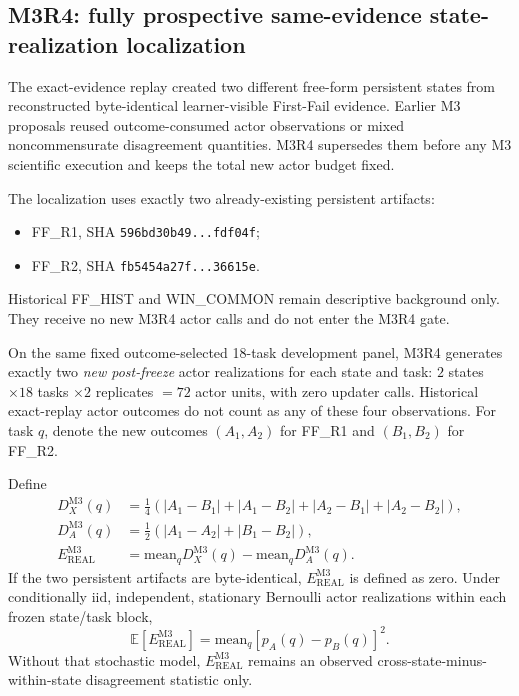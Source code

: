 \subsection{M3R4: fully prospective same-evidence state-realization localization}
The exact-evidence replay created two different free-form persistent states from reconstructed byte-identical learner-visible First-Fail evidence. Earlier M3 proposals reused outcome-consumed actor observations or mixed noncommensurate disagreement quantities. M3R4 supersedes them before any M3 scientific execution and keeps the total new actor budget fixed.

The localization uses exactly two already-existing persistent artifacts:
\begin{itemize}
    \item FF\_R1, SHA \texttt{596bd30b49...fdf04f};
    \item FF\_R2, SHA \texttt{fb5454a27f...36615e}.
\end{itemize}
Historical FF\_HIST and WIN\_COMMON remain descriptive background only. They receive no new M3R4 actor calls and do not enter the M3R4 gate.

On the same fixed outcome-selected 18-task development panel, M3R4 generates exactly two \emph{new post-freeze} actor realizations for each state and task: $2$ states $\times 18$ tasks $\times 2$ replicates $=72$ actor units, with zero updater calls. Historical exact-replay actor outcomes do not count as any of these four observations. For task $q$, denote the new outcomes $(A_1,A_2)$ for FF\_R1 and $(B_1,B_2)$ for FF\_R2.

Define
\begin{align}
D_X^{\mathrm{M3}}(q) &= \tfrac{1}{4}\left(|A_1-B_1|+|A_1-B_2|+|A_2-B_1|+|A_2-B_2|\right),\\
D_A^{\mathrm{M3}}(q) &= \tfrac{1}{2}\left(|A_1-A_2|+|B_1-B_2|\right),\\
E_{\mathrm{REAL}}^{\mathrm{M3}} &= \mathrm{mean}_q D_X^{\mathrm{M3}}(q)-\mathrm{mean}_q D_A^{\mathrm{M3}}(q).
\end{align}
If the two persistent artifacts are byte-identical, $E_{\mathrm{REAL}}^{\mathrm{M3}}$ is defined as zero. Under conditionally iid, independent, stationary Bernoulli actor realizations within each frozen state/task block,
\begin{equation}
\mathbb{E}[E_{\mathrm{REAL}}^{\mathrm{M3}}]
=\mathrm{mean}_q[p_A(q)-p_B(q)]^2.
\end{equation}
Without that stochastic model, $E_{\mathrm{REAL}}^{\mathrm{M3}}$ remains an observed cross-state-minus-within-state disagreement statistic only.

